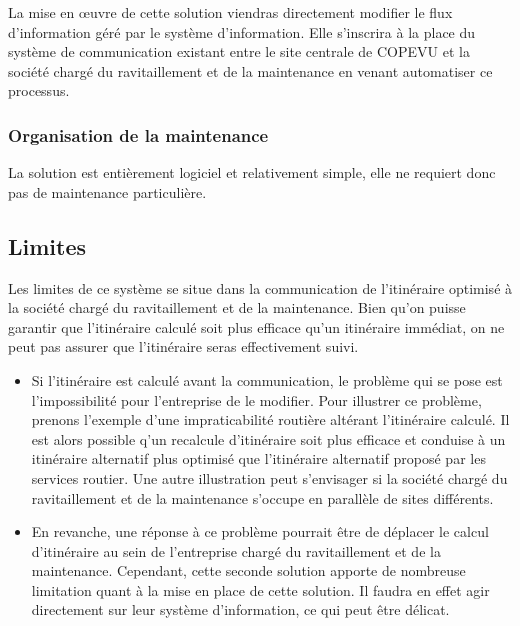             La mise en œuvre de cette solution viendras directement modifier le flux d'information géré par le système d'information.
            Elle s'inscrira à la place du système de communication existant entre le site centrale de COPEVU et la société chargé du ravitaillement et de la maintenance en venant automatiser ce processus.
        
        \subsubsection{Organisation de la maintenance}
    
            La solution est entièrement logiciel et relativement simple, elle ne requiert donc pas de maintenance particulière.
    
    \subsection{Limites}
    
        Les limites de ce système se situe dans la communication de l'itinéraire optimisé à la société chargé du ravitaillement et de la maintenance. Bien qu'on puisse garantir que l'itinéraire calculé soit plus efficace qu'un itinéraire immédiat, on ne peut pas assurer que l'itinéraire seras effectivement suivi.

        \begin{itemize}
            \item Si l'itinéraire est calculé avant la communication, le problème qui se pose est l'impossibilité pour l'entreprise de le modifier.
            Pour illustrer ce problème, prenons l'exemple d'une impraticabilité routière altérant l'itinéraire calculé. Il est alors possible q'un recalcule d'itinéraire soit plus efficace et conduise à un itinéraire alternatif plus optimisé que l'itinéraire alternatif proposé par les services routier.
            Une autre illustration peut s'envisager si la société chargé du ravitaillement et de la maintenance s'occupe en parallèle de sites différents.

            \item En revanche, une réponse à ce problème pourrait être de déplacer le calcul d'itinéraire au sein de l'entreprise chargé du ravitaillement et de la maintenance.
            Cependant, cette seconde solution apporte de nombreuse limitation quant à la mise en place de cette solution.
            Il faudra en effet agir directement sur leur système d'information, ce qui peut être délicat.
        \end{itemize}
        
